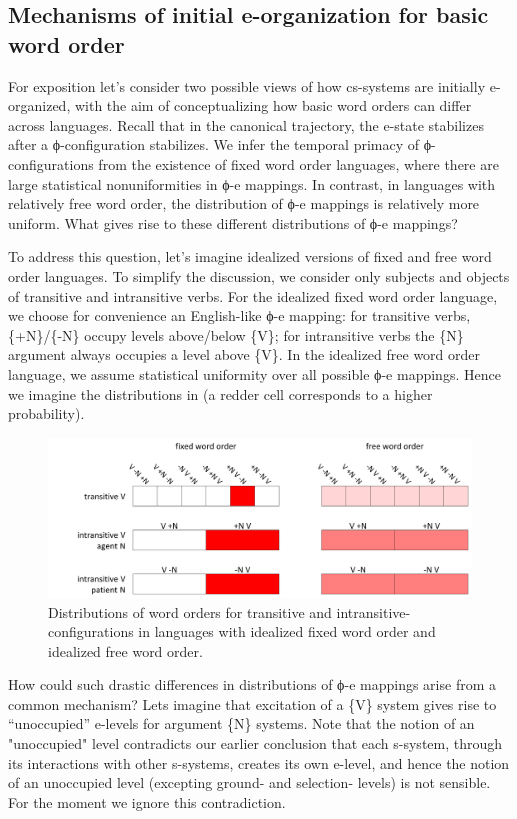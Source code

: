 \subsection{Mechanisms of initial e-organization for basic word order}

For exposition let's consider two possible views of how cs-systems are initially e-organized, with the aim of conceptualizing how basic word orders can differ across languages. Recall that in the canonical trajectory, the e-state stabilizes after a ϕ-configuration stabilizes. We infer the temporal primacy of ϕ-configurations from the existence of fixed word order languages, where there are large statistical nonuniformities in ϕ-e mappings. In contrast, in languages with relatively free word order, the distribution of ϕ-e mappings is relatively more uniform. What gives rise to these different distributions of ϕ-e mappings?

  To address this question, let's imagine idealized versions of fixed and free word order languages. To simplify the discussion, we consider only subjects and objects of transitive and intransitive verbs. For the idealized fixed word order language, we choose for convenience an English-like ϕ-e mapping: for transitive verbs, \{+N\}/\{-N\} occupy levels above/below \{V\}; for intransitive verbs the \{N\} argument always occupies a level above \{V\}. In the idealized free word order language, we assume statistical uniformity over all possible ϕ-e mappings. Hence we imagine the distributions in {} (a redder cell corresponds to a higher probability).

  
\begin{figure}
\includegraphics[width=\textwidth]{figures/Tilsen-img74.png}
\caption{Distributions of word orders for transitive and intransitive-configurations in languages with idealized fixed word order and idealized free word order.}
\label{fig:4:24}
\end{figure}
 

  How could such drastic differences in distributions of ϕ{}-e mappings arise from a common mechanism? Lets imagine that excitation of a \{V\} system gives rise to “unoccupied” e-levels for argument \{N\} systems. Note that the notion of an "unoccupied" level contradicts our earlier conclusion that each s-system, through its interactions with other s-systems, creates its own e-level, and hence the notion of an unoccupied level (excepting ground- and selection- levels) is not sensible. For the moment we ignore this contradiction.

